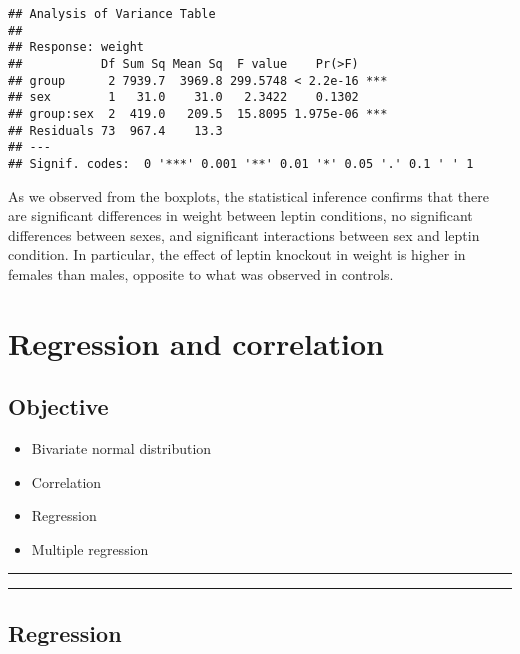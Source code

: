 \documentclass[
]{book}
\providecommand{\tightlist}{%
  \setlength{\itemsep}{0pt}\setlength{\parskip}{0pt}}
\begin{document}
\begin{verbatim}
## Analysis of Variance Table
## 
## Response: weight
##           Df Sum Sq Mean Sq  F value    Pr(>F)    
## group      2 7939.7  3969.8 299.5748 < 2.2e-16 ***
## sex        1   31.0    31.0   2.3422    0.1302    
## group:sex  2  419.0   209.5  15.8095 1.975e-06 ***
## Residuals 73  967.4    13.3                       
## ---
## Signif. codes:  0 '***' 0.001 '**' 0.01 '*' 0.05 '.' 0.1 ' ' 1
\end{verbatim}

As we observed from the boxplots, the statistical inference confirms that there are significant differences in weight between leptin conditions, no significant differences between sexes, and significant interactions between sex and leptin condition. In particular, the effect of leptin knockout in weight is higher in females than males, opposite to what was observed in controls.

\hypertarget{regression-and-correlation}{%
\chapter{Regression and correlation}\label{regression-and-correlation}}

\hypertarget{objective-17}{%
\section{Objective}\label{objective-17}}

\begin{itemize}
\tightlist
\item
  Bivariate normal distribution
\item
  Correlation
\item
  Regression
\item
  Multiple regression
\end{itemize}

\begin{center}\rule{0.5\linewidth}{0.5pt}\end{center}

\begin{center}\rule{0.5\linewidth}{0.5pt}\end{center}

\hypertarget{regression}{%
\section{Regression}\label{regression}}
\end{document}
